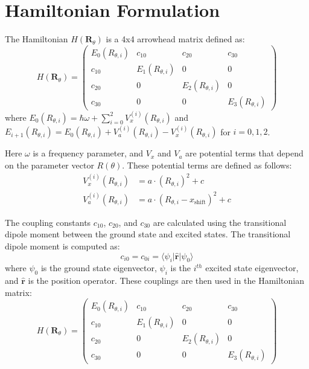 \documentclass{article}
\begin{document}
\section{Hamiltonian Formulation}
The Hamiltonian $H(\bm{R}_{\theta})$ is a 4x4 arrowhead matrix defined as:
\begin{equation}
H(\bm{R}_{\theta}) = \begin{pmatrix}
E_0(R_{\theta,i}) & c_{10} & c_{20} & c_{30} \\
c_{10} & E_1(R_{\theta,i}) & 0 & 0 \\
c_{20} & 0 & E_2(R_{\theta,i}) & 0 \\
c_{30} & 0 & 0 & E_3(R_{\theta,i})
\end{pmatrix}
\end{equation}
where $E_0(R_{\theta,i}) = \hbar\omega + \sum_{i=0}^2 V_x^{(i)}(R_{\theta,i})$ and $E_{i+1}(R_{\theta,i}) = E_0(R_{\theta,i}) + V_a^{(i)}(R_{\theta,i}) - V_x^{(i)}(R_{\theta,i})$ for $i=0,1,2$.

Here $\omega$ is a frequency parameter, and $V_x$ and $V_a$ are potential terms that depend on the parameter vector $R(\theta)$. These potential terms are defined as follows:
\begin{align}
V_x^{(i)}(R_{\theta,i}) &= a \cdot (R_{\theta,i})^2 + c \\
V_a^{(i)}(R_{\theta,i}) &= a \cdot (R_{\theta,i} - x_{\text{shift}})^2 + c
\end{align}

The coupling constants $c_{10}$, $c_{20}$, and $c_{30}$ are calculated using the transitional dipole moment between the ground state and excited states. The transitional dipole moment is computed as:
\begin{equation}
c_{i0} = c_{0i} = \langle \psi_i | \hat{\bm{r}} | \psi_0 \rangle
\end{equation}
where $\psi_0$ is the ground state eigenvector, $\psi_i$ is the $i^{th}$ excited state eigenvector, and $\hat{\bm{r}}$ is the position operator. These couplings are then used in the Hamiltonian matrix:
\begin{equation}
H(\bm{R}_{\theta}) = \begin{pmatrix}
E_0(R_{\theta,i}) & c_{10} & c_{20} & c_{30} \\
c_{10} & E_1(R_{\theta,i}) & 0 & 0 \\
c_{20} & 0 & E_2(R_{\theta,i}) & 0 \\
c_{30} & 0 & 0 & E_3(R_{\theta,i})
\end{pmatrix}
\end{equation}
\end{document}
